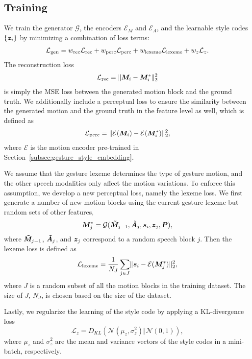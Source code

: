 \subsection{Training}
We train the generator $\mathcal{G}$, the encoders $\mathcal{E}_M$ and $\mathcal{E}_A$, and the learnable style codes $\{\bm{z}_i\}$ by minimizing a combination of loss terms:
\begin{equation}
    \mathcal{L}_{{\text{gen}}} 
    = w_{{\text{rec}}}\mathcal{L}_{{\text{rec}}}
    + w_{{\text{perc}}}\mathcal{L}_{{\text{perc}}}
    + w_{{\text{lexeme}}}\mathcal{L}_{{\text{lexeme}}}
    + w_{{z}}\mathcal{L}_{{z}}.\label{eqn:generator_loss}
\end{equation}
The reconstruction loss 
\begin{equation}
    \mathcal{L}_{{\text{rec}}}=\lVert \bm{M}_i - \bm{M}_i^* \rVert_2^2   
\end{equation}
is simply the MSE loss between the generated motion block and the ground truth. We additionally include a perceptual loss to ensure the similarity between the generated motion and the ground truth in the feature level as well, which is defined as
\begin{equation}
    \mathcal{L}_{{\text{perc}}} = \lVert \mathcal{E}(\bm{M}_i) - \mathcal{E}(\bm{M}_i^*) \rVert_2^2 ,
\end{equation}
where $\mathcal{E}$ is the motion encoder pre-trained in Section~\ref{subsec:gesture_style_embedding}.

We assume that the gesture lexeme determines the type of gesture motion, and the other speech modalities only affect the motion variations. To enforce this assumption, we develop a new perceptual loss, namely the lexeme loss. We first generate a number of new motion blocks using the current gesture lexeme but random sets of other features, 
\begin{equation}
    \bm{M}^{*}_j = \mathcal{G}(\bm{\tilde{M}}_{j-1}, \bm{\tilde{A}}_{j}, \bm{s}_i, \bm{z}_j, \bm{P}) ,
\end{equation}
where $\bm{\tilde{M}}_{j-1}$, $\bm{\tilde{A}}_{j}$, and $\bm{z}_j$ correspond to a random speech block $j$. Then the lexeme loss is defined as 
\begin{equation}
    \mathcal{L}_{{\text{lexeme}}}=\frac{1}{N_J}\sum_{j\in{}J}\lVert \bm{s}_i - \mathcal{E}(\bm{M}_j^*) \rVert_2^2 ,
\end{equation}
where $J$ is a random subset of all the motion blocks in the training dataset. The size of $J$, $N_J$, is chosen based on the size of the dataset.

Lastly, we regularize the learning of the style code by applying a KL-divergence loss
\begin{equation}
    \mathcal{L}_{z} = D_{KL}(\mathcal{N}(\mu_z, \sigma^2_z) \Vert \mathcal{N}(0, 1)),
\end{equation}
where $\mu_z$ and $\sigma^2_z$ are the mean and variance vectors of the style codes in a mini-batch, respectively.